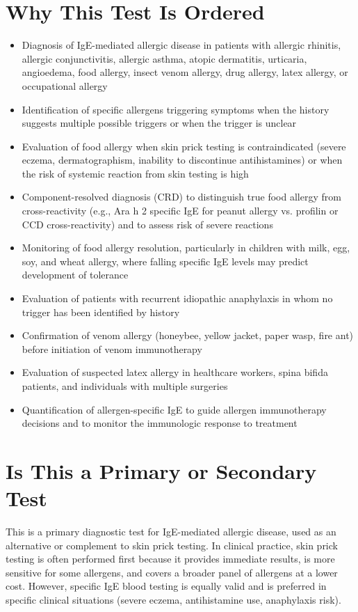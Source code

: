 \section*{Why This Test Is Ordered}
\begin{itemize}
  \item Diagnosis of IgE-mediated allergic disease in patients with allergic rhinitis, allergic conjunctivitis, allergic asthma, atopic dermatitis, urticaria, angioedema, food allergy, insect venom allergy, drug allergy, latex allergy, or occupational allergy
  \item Identification of specific allergens triggering symptoms when the history suggests multiple possible triggers or when the trigger is unclear
  \item Evaluation of food allergy when skin prick testing is contraindicated (severe eczema, dermatographism, inability to discontinue antihistamines) or when the risk of systemic reaction from skin testing is high
  \item Component-resolved diagnosis (CRD) to distinguish true food allergy from cross-reactivity (e.g., Ara h 2 specific IgE for peanut allergy vs. profilin or CCD cross-reactivity) and to assess risk of severe reactions
  \item Monitoring of food allergy resolution, particularly in children with milk, egg, soy, and wheat allergy, where falling specific IgE levels may predict development of tolerance
  \item Evaluation of patients with recurrent idiopathic anaphylaxis in whom no trigger has been identified by history
  \item Confirmation of venom allergy (honeybee, yellow jacket, paper wasp, fire ant) before initiation of venom immunotherapy
  \item Evaluation of suspected latex allergy in healthcare workers, spina bifida patients, and individuals with multiple surgeries
  \item Quantification of allergen-specific IgE to guide allergen immunotherapy decisions and to monitor the immunologic response to treatment
\end{itemize}

\section*{Is This a Primary or Secondary Test}
This is a primary diagnostic test for IgE-mediated allergic disease, used as an alternative or complement to skin prick testing. In clinical practice, skin prick testing is often performed first because it provides immediate results, is more sensitive for some allergens, and covers a broader panel of allergens at a lower cost. However, specific IgE blood testing is equally valid and is preferred in specific clinical situations (severe eczema, antihistamine use, anaphylaxis risk).

